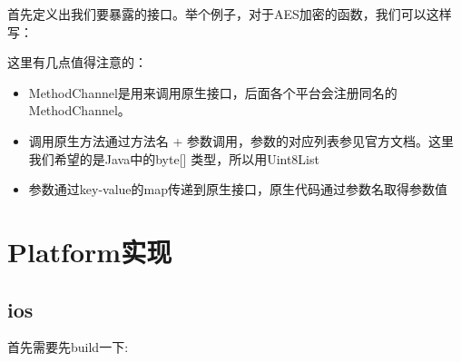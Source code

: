 \documentclass[12pt]{article}
\begin{document}
首先定义出我们要暴露的接口。举个例子，对于AES加密的函数，我们可以这样写：

\begin{Shaded}
\begin{Highlighting}[]
\OperatorTok{\{}
   \OperatorTok{=} \NormalTok{);}

   \OperatorTok{\textless{}}\OperatorTok{\textgreater{}}
\OperatorTok{,}\OperatorTok{,} \OperatorTok{\{}
     
        \OperatorTok{,} \OperatorTok{\{}\OperatorTok{:}\OperatorTok{,} \OperatorTok{:}\OperatorTok{,} \OperatorTok{:}\OperatorTok{\}}\NormalTok{);}
  \OperatorTok{\}}
\end{Highlighting}
\end{Shaded}

这里有几点值得注意的：

\begin{itemize}
\tightlist
\item
  MethodChannel是用来调用原生接口，后面各个平台会注册同名的MethodChannel。
\item
  调用原生方法通过方法名 + 参数调用，参数的对应列表参见官方文档。这里我们希望的是Java中的byte{[}{]} 类型，所以用Uint8List
\item
  参数通过key-value的map传递到原生接口，原生代码通过参数名取得参数值
\end{itemize}

\section{Platform实现}\label{platformux5b9eux73b0}

\subsection{ios}\label{ios}

首先需要先build一下:

\begin{Shaded}
\begin{Highlighting}[]
\KeywordTok{;} 
\end{Highlighting}
\end{Shaded}
\end{document}
